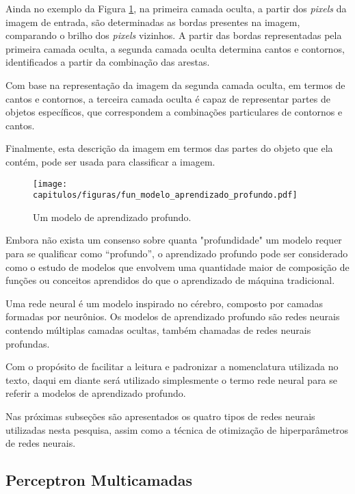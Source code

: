 Ainda no exemplo da Figura \ref{fig:fun_modelo_aprendizado_profundo}, na primeira camada oculta, a partir dos \textit{pixels} da imagem de entrada, são determinadas as bordas presentes na imagem, comparando o brilho dos \textit{pixels} vizinhos. A partir das bordas representadas pela primeira camada oculta, a segunda camada oculta determina cantos e contornos, identificados a partir da combinação das arestas. 

Com base na representação da imagem da segunda camada oculta, em termos de cantos e contornos, a terceira camada oculta é capaz de representar partes de objetos específicos, que correspondem a combinações particulares de contornos e cantos. 

Finalmente, esta descrição da imagem em termos das partes do objeto que ela contém, pode ser usada para classificar a imagem. 

\begin{figure}[!ht]
\centering
\texttt{[image: capitulos/figuras/fun\_modelo\_aprendizado\_profundo.pdf]}
\caption{Um modelo de aprendizado profundo.}
\label{fig:fun_modelo_aprendizado_profundo}
\end{figure}

Embora não exista um consenso sobre quanta "profundidade" um modelo requer para se qualificar como “profundo”, o aprendizado profundo pode ser considerado como o estudo de modelos que envolvem uma quantidade maior de composição de funções ou conceitos aprendidos do que o aprendizado de máquina tradicional.

Uma rede neural é um modelo inspirado no cérebro, composto por camadas formadas por neurônios. Os modelos de aprendizado profundo são redes neurais contendo múltiplas camadas ocultas, também chamadas de redes neurais profundas. 

Com o propósito de facilitar a leitura e padronizar a nomenclatura utilizada no texto, daqui em diante será utilizado simplesmente o termo rede neural para se referir a modelos de aprendizado profundo.

Nas próximas subseções são apresentados os quatro tipos de redes neurais utilizadas nesta pesquisa, assim como a técnica de otimização de hiperparâmetros de redes neurais.

\subsection{Perceptron Multicamadas}\label{subsec:cap_fundamentos_ann}

